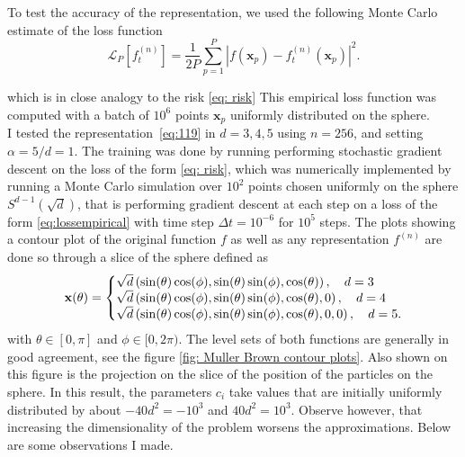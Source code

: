 \documentclass{article}
\theoremstyle{mystyle}
\begin{document}
 To test the accuracy of the
representation, we used the following Monte Carlo estimate of the loss
function
%
 \begin{equation}
   \label{eq:lossempirical}
   \mathcal{L}_P[f^{(n)}_t] = \frac{1}{2P} \sum_{p=1}^P \left|f(\mathbf{x}_p) - f^{(n)}_t(\mathbf{x}_p)\right|^2.
 \end{equation}

 which is in close analogy to the risk \ref{eq: risk}
 This empirical loss function was computed with a batch of $10^6$
 points $\mathbf{x}_p$ uniformly distributed on the sphere.\\

I tested the representation~\eqref{eq:119} in $d=3,4,5$ using $n=256$, and setting $\alpha = 5/d= 1$. The training was done
by running performing stochastic gradient descent on the loss of the form \ref{eq: risk}, which was numerically implemented by running a Monte Carlo simulation over $ 10^2$ points chosen uniformly on the sphere $ S^{d-1}(\sqrt{d})$, that is performing gradient descent at each step on a loss of the form \ref{eq:lossempirical} with
time step $\Delta t = 10^{-6}$ for $10^5$ steps. The plots
showing a contour plot of the original function $f$
as well as any representation $f^{(n)}$ are done so through a slice of the
sphere defined as
%
\begin{equation}
  \label{eq:slice}
  \mathbf{x}(\theta) =\left\lbrace
  \begin{array}{@{}l@{}}
       \sqrt{d} \left(\sin(\theta)\cos(\phi),
    \sin(\theta)\sin(\phi),
    \cos(\theta)\right), \quad d = 3\\
\sqrt{d} \left(\sin(\theta)\cos(\phi),
    \sin(\theta)\sin(\phi),
    \cos(\theta),0\right), \quad d = 4\\
      \sqrt{d} \left(\sin(\theta)\cos(\phi),
    \sin(\theta)\sin(\phi),
    \cos(\theta),0,0\right), \quad d = 5.
  \end{array}\right. 
\end{equation}%
with $\theta\in[0,\pi]$ and $\phi\in [0,2\pi)$. The level sets of both functions are generally in good agreement, see the figure \ref{fig: Muller Brown contour plots}. Also shown on
this figure is the projection on the slice of the position of the
particles on the sphere. In this result, the parameters $c_i$ take
values that are initially uniformly distributed by about
$-40 d^2 = -10^3$ and $40 d^2 = 10^3$. Observe however, that increasing the dimensionality of the problem worsens the approximations. Below are some observations I made.\\ 
\end{document}
